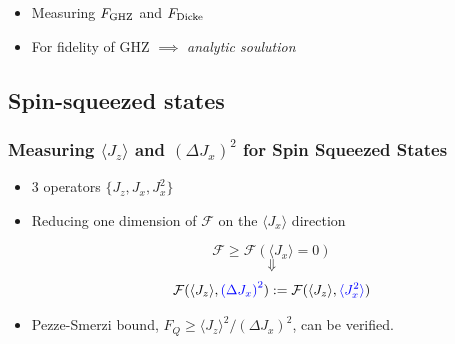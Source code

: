 \documentclass{beamer}
\newcommand{\expect}[1]{\ensuremath{\langle #1 \rangle}}
\newcommand{\varian}[1]{\ensuremath{\left(\Delta #1 \right)^2}}
\begin{document}
		\begin{frame}
			\begin{itemize}
				\item<1-> Measuring $F_{\rm GHZ}$ and $F_{\rm Dicke}$
				\vspace{10px}

				\item<3-> For fidelity of GHZ $\implies$ \emph{\color{blue}analytic soulution}
			\end{itemize}
		\end{frame}

	\subsection{Spin-squeezed states}

		\begin{frame}

			\frametitle{Measuring $\expect{J_z}$ and $\varian{J_x}$ for Spin Squeezed States}

			\begin{itemize}
				\item<1-> 3 operators {\color{blue}$\{ J_z,J_x,J_x^2 \}$}
				\vspace{5px}
				\item<2-> Reducing one dimension of $\mathcal{F}$ on the $\expect{J_x}$ direction
				\begin{block}{}
					\[\mathcal{F} \geq \mathcal{F}(\expect{J_x}=0)\]
					\[\Downarrow\]
					\[\mathcal{F}(\expect{J_z},{\color{blue}\varian{J_x}}) := \mathcal{F}(\expect{J_z},{\color{blue}\expect{J_x^2}})
					\]
				\end{block}
				\vspace{5px}
				\item<3-> Pezze-Smerzi bound, $F_Q\geq \expect{J_z}^2/\varian{J_x}$, can be verified.
			\end{itemize}

		\end{frame}
\end{document}
